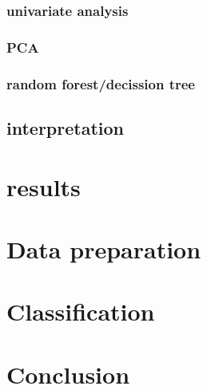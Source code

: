 \subsection{univariate analysis}
\subsection{PCA}
\subsection{random forest/decission tree}
\section{interpretation}

\chapter{results}
%



\chapter{Data preparation}
\chapter{Classification}
\chapter*{Conclusion}